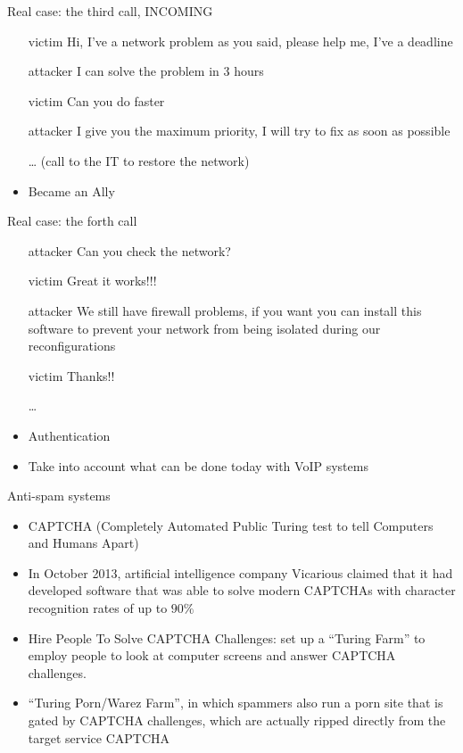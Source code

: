 \documentclass{beamer}
\begin{document}
\begin{frame}{Real case: the third call, INCOMING}
  \begin{itemize}
    \item[victim] Hi, I've a network problem as you said, please
      help me, I've a deadline
    \item[attacker] I can solve the problem in 3 hours
    \item[victim] Can you do faster
    \item[attacker] I give you the maximum priority, I will try to fix
      as soon as possible
    \item[\dots] (call to the IT to restore the network)
    \item Became an Ally
  \end{itemize}
\end{frame}

\begin{frame}{Real case: the forth call}
  \begin{itemize}
    \item[attacker] Can you check the network?
    \item[victim] Great it works!!!
    \item[attacker] We still have firewall problems, if you want you
      can install this software to prevent your network from being
      isolated during our reconfigurations 
    \item[victim] Thanks!!
    \item[\dots] 
    \item Authentication
    \item Take into account what can be done today with VoIP systems
  \end{itemize}
\end{frame}

\begin{frame}{Anti-spam systems}
  \begin{itemize}
    \item CAPTCHA (Completely Automated Public Turing test to tell
      Computers and Humans Apart)
    \item In October 2013, artificial intelligence company Vicarious
      claimed that it had developed software that was able to solve
      modern CAPTCHAs with character recognition rates of up to $90\%$
    \item<2-> Hire People To Solve CAPTCHA Challenges: 
set up a ``Turing Farm'' to
employ people to look at computer screens and answer CAPTCHA
challenges. 
\item<3-> ``Turing Porn/Warez Farm'', in which spammers also run a porn site that is
  gated by CAPTCHA challenges, which are actually ripped directly from
  the target service CAPTCHA
  \end{itemize}
\end{frame}
\end{document}
